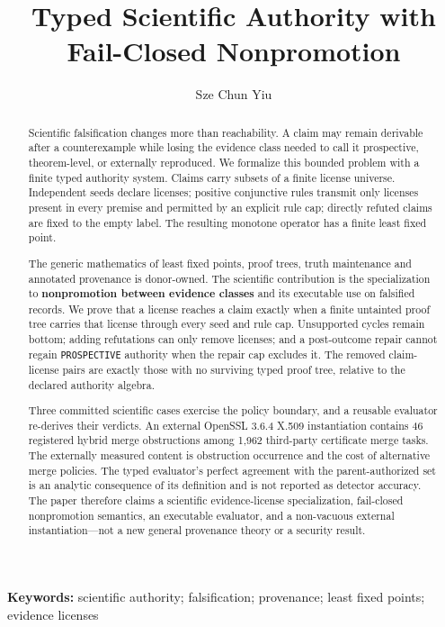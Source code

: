 \documentclass[11pt]{article}
\title{Typed Scientific Authority with Fail-Closed Nonpromotion}
\author{Sze Chun Yiu}
\date{}
\begin{document}
\maketitle

\begin{abstract}
Scientific falsification changes more than reachability. A claim may
remain derivable after a counterexample while losing the evidence class
needed to call it prospective, theorem-level, or externally reproduced.
We formalize this bounded problem with a finite typed authority system.
Claims carry subsets of a finite license universe. Independent seeds
declare licenses; positive conjunctive rules transmit only licenses
present in every premise and permitted by an explicit rule cap; directly
refuted claims are fixed to the empty label. The resulting monotone
operator has a finite least fixed point.

The generic mathematics of least fixed points, proof trees, truth
maintenance and annotated provenance is donor-owned. The scientific
contribution is the specialization to \textbf{nonpromotion between
evidence classes} and its executable use on falsified records. We prove
that a license reaches a claim exactly when a finite untainted proof
tree carries that license through every seed and rule cap. Unsupported
cycles remain bottom; adding refutations can only remove licenses; and a
post-outcome repair cannot regain \texttt{PROSPECTIVE} authority when
the repair cap excludes it. The removed claim-license pairs are exactly
those with no surviving typed proof tree, relative to the declared
authority algebra.

Three committed scientific cases exercise the policy boundary, and a
reusable evaluator re-derives their verdicts. An external OpenSSL 3.6.4
X.509 instantiation contains 46 registered hybrid merge obstructions
among 1,962 third-party certificate merge tasks. The externally measured
content is obstruction occurrence and the cost of alternative merge
policies. The typed evaluator's perfect agreement with the
parent-authorized set is an analytic consequence of its definition and
is not reported as detector accuracy. The paper therefore claims a
scientific evidence-license specialization, fail-closed nonpromotion
semantics, an executable evaluator, and a non-vacuous external
instantiation---not a new general provenance theory or a security
result.
\end{abstract}

\noindent\textbf{Keywords:} scientific authority; falsification; provenance; least fixed points; evidence licenses
\end{document}
